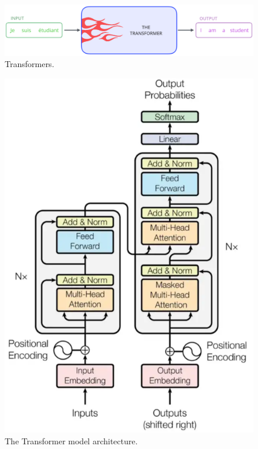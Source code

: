 \begin{figure}[H]
	\centering
	\includegraphics[width=\textwidth]{
        images/16_DeepLearning_transformers.png
    }
	\caption{Transformers.}
	\label{fig:transformers}
\end{figure}

\begin{figure}[H]
	\centering
	\includegraphics[width=\textwidth]{
		images/16_DeepLearning_transformerArchitecture.png
	}
	\caption{The Transformer model architecture.}
	\label{fig:transformerMedium}
\end{figure}

